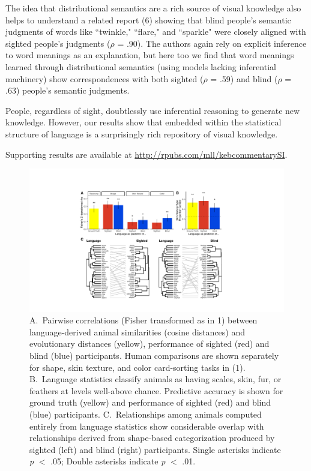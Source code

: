 \documentclass[12pt]{article}
\begin{document}
The idea that distributional semantics are a rich source of visual knowledge also helps to understand a related report (6) showing that blind people's semantic judgments of words like ``twinkle," ``flare," and ``sparkle" were closely aligned with sighted people's judgments ($\rho$ = .90). The authors again rely on explicit inference to word meanings as an explanation, but here too we find that word meanings learned through distributional semantics (using models lacking inferential machinery) show correspondences with both sighted ($\rho$ = .59) and blind ($\rho$ = .63) people's semantic judgments. 

People, regardless of sight, doubtlessly use inferential reasoning to generate new knowledge. However, our results show that embedded within the statistical structure of language is a surprisingly rich repository of visual knowledge.

Supporting results are available at \url{http://rpubs.com/mll/kebcommentarySI}.
\pagebreak

\begin{figure}[h!]
\centering
     \includegraphics[width=7in]{figure_ppt3.pdf}
      \caption{\footnotesize  A.\ Pairwise correlations (Fisher transformed as in 1) between language-derived animal similarities (cosine distances) and evolutionary distances (yellow), performance of sighted (red) and blind (blue) participants. Human comparisons are shown separately for shape, skin texture, and color card-sorting tasks in (1). B.\ Language statistics classify animals as having scales, skin, fur, or feathers at levels well-above chance. Predictive accuracy is shown for ground truth (yellow) and performance of sighted (red) and blind (blue) participants.  C.\ Relationships among animals computed entirely from language statistics show considerable overlap with relationships derived from shape-based categorization produced by sighted (left) and blind (right) participants. Single asterisks indicate \textit{p} $<$  .05; Double asterisks indicate \textit{p} $<$ .01. }
\end{figure}
\end{document}
